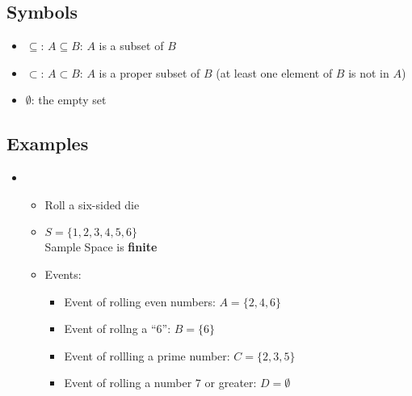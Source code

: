 \documentclass[12pt]{article}
\begin{document}
        \subsection{Symbols}
            \begin{itemize}
                \item $\subseteq$: $A \subseteq B$: $A$ is a subset of $B$
                \item $\subset$: $A \subset B$: $A$ is a proper subset of $B$ (at least one element of $B$ is not in $A$)
                \item $\emptyset$: the empty set
            \end{itemize}
        \subsection{Examples}
            \begin{itemize}
                \item 
                    \begin{itemize}
                        \item Roll a six-sided die
                        \item $S = \{1, 2, 3, 4, 5, 6\}$
                        \\Sample Space is \textbf{finite}
                        \item Events:
                            \begin{itemize}
                                \item Event of rolling even numbers: $A = \{2, 4, 6\}$
                                \item Event of rollng a ``$6$'': $B = \{6\}$
                                \item Event of rollling a prime number: $C = \{2, 3, 5\}$
                                \item Event of rolling a number $7$ or greater: $D = \emptyset$
                            \end{itemize}
                    \end{itemize}
            \end{itemize}
\end{document}
